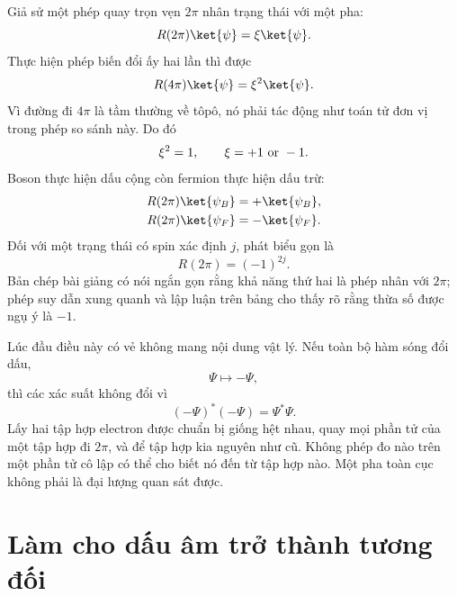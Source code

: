 Giả sử một phép quay trọn vẹn \(2\pi\) nhân trạng thái với một pha:
\begin{equation}
R(2\pi)\ket{\psi}=\xi\ket{\psi}.
\end{equation}
Thực hiện phép biến đổi ấy hai lần thì được
\begin{equation}
R(4\pi)\ket{\psi}=\xi^2\ket{\psi}.
\end{equation}
Vì đường đi \(4\pi\) là tầm thường về tôpô, nó phải tác động như toán tử đơn vị trong phép so sánh này. Do đó
\begin{equation}
\xi^2=1,
\qquad
\xi=+1\ \hbox{or}\ -1.
\end{equation}
Boson thực hiện dấu cộng còn fermion thực hiện dấu trừ:
\begin{align}
R(2\pi)\ket{\psi_B}&=+\ket{\psi_B},\\
R(2\pi)\ket{\psi_F}&=-\ket{\psi_F}.
\end{align}
Đối với một trạng thái có spin xác định \(j\), phát biểu gọn là
\begin{equation}
R(2\pi)=(-1)^{2j}.
\end{equation}
Bản chép bài giảng có nói ngắn gọn rằng khả năng thứ hai là phép nhân với \(2\pi\); phép suy dẫn xung quanh và lập luận trên bảng cho thấy rõ rằng thừa số được ngụ ý là \(-1\).

Lúc đầu điều này có vẻ không mang nội dung vật lý. Nếu toàn bộ hàm sóng đổi dấu,
\begin{equation}
\Psi\longmapsto-\Psi,
\end{equation}
thì các xác suất không đổi vì
\begin{equation}
(-\Psi)^*(-\Psi)=\Psi^*\Psi.
\end{equation}
Lấy hai tập hợp electron được chuẩn bị giống hệt nhau, quay mọi phần tử của một tập hợp đi \(2\pi\), và để tập hợp kia nguyên như cũ. Không phép đo nào trên một phần tử cô lập có thể cho biết nó đến từ tập hợp nào. Một pha toàn cục không phải là đại lượng quan sát được.

\section{Làm cho dấu âm trở thành tương đối}

